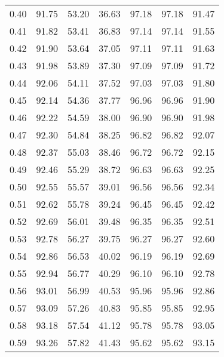 \begin{tabular}{|c|c|c|c|c|c|c|}
      0.40 &     91.75 &     53.20 &      36.63 &   97.18 &      97.18 &         91.47 \\
      0.41 &     91.82 &     53.41 &      36.83 &   97.14 &      97.14 &         91.55 \\
      0.42 &     91.90 &     53.64 &      37.05 &   97.11 &      97.11 &         91.63 \\
      0.43 &     91.98 &     53.89 &      37.30 &   97.09 &      97.09 &         91.72 \\
      0.44 &     92.06 &     54.11 &      37.52 &   97.03 &      97.03 &         91.80 \\
      0.45 &     92.14 &     54.36 &      37.77 &   96.96 &      96.96 &         91.90 \\
      0.46 &     92.22 &     54.59 &      38.00 &   96.90 &      96.90 &         91.98 \\
      0.47 &     92.30 &     54.84 &      38.25 &   96.82 &      96.82 &         92.07 \\
      0.48 &     92.37 &     55.03 &      38.46 &   96.72 &      96.72 &         92.15 \\
      0.49 &     92.46 &     55.29 &      38.72 &   96.63 &      96.63 &         92.25 \\
      0.50 &     92.55 &     55.57 &      39.01 &   96.56 &      96.56 &         92.34 \\
      0.51 &     92.62 &     55.78 &      39.24 &   96.45 &      96.45 &         92.42 \\
      0.52 &     92.69 &     56.01 &      39.48 &   96.35 &      96.35 &         92.51 \\
      0.53 &     92.78 &     56.27 &      39.75 &   96.27 &      96.27 &         92.60 \\
      0.54 &     92.86 &     56.53 &      40.02 &   96.19 &      96.19 &         92.69 \\
      0.55 &     92.94 &     56.77 &      40.29 &   96.10 &      96.10 &         92.78 \\
      0.56 &     93.01 &     56.99 &      40.53 &   95.96 &      95.96 &         92.86 \\
      0.57 &     93.09 &     57.26 &      40.83 &   95.85 &      95.85 &         92.95 \\
      0.58 &     93.18 &     57.54 &      41.12 &   95.78 &      95.78 &         93.05 \\
      0.59 &     93.26 &     57.82 &      41.43 &   95.62 &      95.62 &         93.15 \\

\end{tabular}
